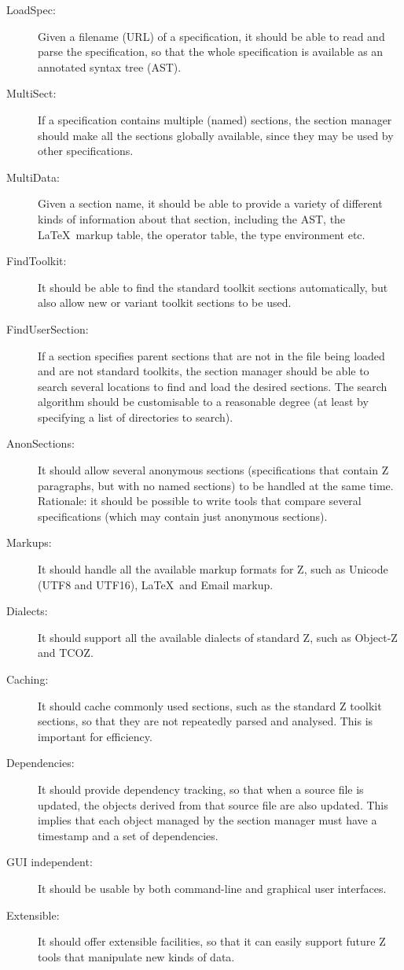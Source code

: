 \documentclass{llncs} %
\begin{document}
\begin{description}
\item[LoadSpec:] Given a filename (URL) of a specification, it should be 
  able to read and parse the specification, so that the whole
  specification is available as an annotated syntax tree (AST).
\item[MultiSect:] If a specification contains multiple (named) sections,
  the section manager should make all the sections globally available,
  since they may be used by other specifications.
\item[MultiData:] Given a section name, it should be able to provide a
  variety of different kinds of information about that section, including
  the AST, the \LaTeX\ markup table, the operator table, the type
  environment etc. 
\item[FindToolkit:] It should be able to find the standard toolkit sections
  automatically, but also allow new or variant toolkit sections to be used.
\item[FindUserSection:] If a section specifies parent sections that are not in
  the file being loaded and are not standard toolkits, the section manager
  should be able to search several locations to find and load the desired
  sections.  The search algorithm should be customisable to a reasonable
  degree (at least by specifying a list of directories to search). 
\item[AnonSections:] It should allow several anonymous sections
  (specifications that contain Z paragraphs, but with no named sections)
  to be handled at the same time.  Rationale: it should be possible
  to write tools that compare several specifications (which may contain
  just anonymous sections).
\item[Markups:] It should handle all the available markup formats for Z,
  such as Unicode (UTF8 and UTF16), \LaTeX\ and Email markup.
\item[Dialects:] It should support all the available dialects of standard Z,
  such as Object-Z and TCOZ.
\item[Caching:] It should cache commonly used sections, such as the
  standard Z toolkit sections, so that they are not repeatedly
  parsed and analysed.  This is important for efficiency.
\item[Dependencies:] It should provide dependency tracking, so that when a
  source file is updated, the objects derived from that source file are
  also updated.  This implies that each object managed by the section
  manager must have a timestamp and a set of dependencies. 
\item[GUI independent:] It should be usable by both command-line and graphical
  user interfaces. 
\item[Extensible:] It should offer extensible facilities, so that it can
  easily support future Z tools that manipulate new kinds of data.
\end{description}
\end{document}
